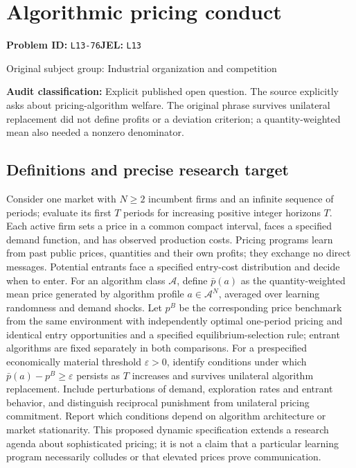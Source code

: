 \documentclass[11pt,a4paper]{article}
\begin{document}
\section*{Algorithmic pricing conduct}
\textbf{Problem ID:} \texttt{L13-76}\quad \textbf{JEL:} \texttt{L13}\par
\label{problem:OP-0398}
{\sffamily\small\color{muted}Original subject group: Industrial organization and competition\par}
\label{definitions:problem:30007680}
\textbf{Audit classification:} Explicit published open question. The source explicitly asks about pricing-algorithm welfare. The original phrase survives unilateral replacement did not define profits or a deviation criterion; a quantity-weighted mean also needed a nonzero denominator.
\subsection*{Definitions and precise research target}
Consider one market with \(N\geq2\) incumbent firms and an infinite sequence of periods; evaluate its first \(T\) periods for increasing positive integer horizons \(T\). Each active firm sets a price in a common compact interval, faces a specified demand function, and has observed production costs. Pricing programs learn from past public prices, quantities and their own profits; they exchange no direct messages. Potential entrants face a specified entry-cost distribution and decide when to enter. For an algorithm class \(\mathcal A\), define \(\bar p(a)\) as the quantity-weighted mean price generated by algorithm profile \(a\in\mathcal A^N\), averaged over learning randomness and demand shocks. Let \(p^B\) be the corresponding price benchmark from the same environment with independently optimal one-period pricing and identical entry opportunities and a specified equilibrium-selection rule; entrant algorithms are fixed separately in both comparisons. For a prespecified economically material threshold \(\varepsilon>0\), identify conditions under which \(\bar p(a)-p^B\geq\varepsilon\) persists as \(T\) increases and survives unilateral algorithm replacement. Include perturbations of demand, exploration rates and entrant behavior, and distinguish reciprocal punishment from unilateral pricing commitment. Report which conditions depend on algorithm architecture or market stationarity. This proposed dynamic specification extends a research agenda about sophisticated pricing; it is not a claim that a particular learning program necessarily colludes or that elevated prices prove communication.
\end{document}
